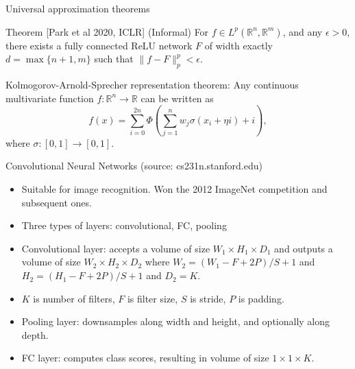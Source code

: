 \documentclass[final]{beamer}
\begin{document}
\begin{frame}{Universal approximation theorems}
	\begin{tcolorbox}
		Theorem [Park et al 2020, ICLR] (Informal) For $f\in L^p(\mathbb{R}^n, \mathbb{R}^m)$, and any $\epsilon > 0$, there exists a fully connected ReLU network $F$ of width exactly $d = \max\{n+1,m\}$ such that $\|f - F\|_p^p < \epsilon.$
	\end{tcolorbox}
	\begin{tcolorbox}
		Kolmogorov-Arnold-Sprecher representation theorem: Any continuous multivariate function $f:\mathbb{R}^n\to\mathbb{R}$ can be written as $$f(x) = \sum_{i=0}^{2n} \Phi(\sum_{j=1}^n w_j\sigma(x_i+\eta i) + i),$$ where $\sigma:[0,1]\to[0,1].$
	\end{tcolorbox}
\end{frame}
\begin{frame}{Convolutional Neural Networks (source: cs231n.stanford.edu)}
	\begin{itemize}
		\item Suitable for image recognition. Won the 2012 ImageNet competition and subsequent ones.
		\item Three types of layers: convolutional, FC, pooling
		\item Convolutional layer: accepts a volume of size $W_1 \times H_1 \times D_1$ and outputs a volume of size $W_2 \times H_2 \times D_2$ where $W_2 = (W_1 - F + 2P)/S + 1$ and $H_2 = (H_1 - F + 2P)/S + 1$ and $D_2 = K$.

		\item $K$ is number of filters, $F$ is filter size, $S$ is stride, $P$ is padding.
		\item Pooling layer: downsamples along width and height, and optionally along depth.
		\item FC layer: computes class scores, resulting in volume of size $1 \times 1 \times K$.

	
	\end{itemize}
\end{frame}
\end{document}

